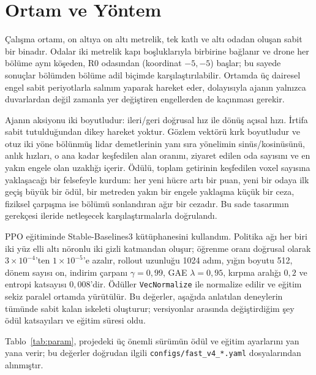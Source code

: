 \documentclass[11pt,a4paper]{article}
\begin{document}
\section{Ortam ve Yöntem}

Çalışma ortamı, on altıya on altı metrelik, tek katlı ve altı odadan oluşan sabit bir binadır.
Odalar iki metrelik kapı boşluklarıyla birbirine bağlanır ve drone her bölüme aynı köşeden, R0
odasından (koordinat $-5,-5$) başlar; bu sayede sonuçlar bölümden bölüme adil biçimde
karşılaştırılabilir. Ortamda üç dairesel engel sabit periyotlarla salınım yaparak hareket eder,
dolayısıyla ajanın yalnızca duvarlardan değil zamanla yer değiştiren engellerden de kaçınması
gerekir.

Ajanın aksiyonu iki boyutludur: ileri/geri doğrusal hız ile dönüş açısal hızı. İrtifa sabit
tutulduğundan dikey hareket yoktur. Gözlem vektörü kırk boyutludur ve otuz iki yöne bölünmüş lidar
demetlerinin yanı sıra yönelimin sinüs/kosinüsünü, anlık hızları, o ana kadar keşfedilen alan oranını,
ziyaret edilen oda sayısını ve en yakın engele olan uzaklığı içerir. Ödülü, toplam getirinin
keşfedilen voxel sayısına yaklaşacağı bir felsefeyle kurdum: her yeni hücre artı bir puan, yeni bir
odaya ilk geçiş büyük bir ödül, bir metreden yakın bir engele yaklaşma küçük bir ceza, fiziksel
çarpışma ise bölümü sonlandıran ağır bir cezadır. Bu sade tasarımın gerekçesi ileride netleşecek
karşılaştırmalarla doğrulandı.

PPO eğitiminde Stable-Baselines3 kütüphanesini kullandım. Politika ağı her biri iki yüz elli altı
nöronlu iki gizli katmandan oluşur; öğrenme oranı doğrusal olarak $3\times10^{-4}$'ten
$1\times10^{-5}$'e azalır, rollout uzunluğu 1024 adım, yığın boyutu 512, dönem sayısı on, indirim
çarpanı $\gamma=0{,}99$, GAE $\lambda=0{,}95$, kırpma aralığı $0{,}2$ ve entropi katsayısı
$0{,}008$'dir. Ödüller \texttt{VecNormalize} ile normalize edilir ve eğitim sekiz paralel ortamda
yürütülür. Bu değerler, aşağıda anlatılan deneylerin tümünde sabit kalan iskeleti oluşturur;
versiyonlar arasında değiştirdiğim şey ödül katsayıları ve eğitim süresi oldu.

Tablo~\ref{tab:param}, projedeki üç önemli sürümün ödül ve eğitim ayarlarını yan yana verir; bu
değerler doğrudan ilgili \texttt{configs/fast\_v4\_*.yaml} dosyalarından alınmıştır.
\end{document}
